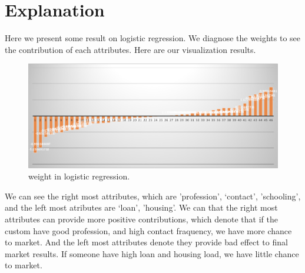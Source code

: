 \section{Explanation}

Here we present some result on logistic regression. We diagnose the weights to see the contribution of each attributes. Here are our visualization results.

\begin{figure}[ht]
    \centering
    \includegraphics[width=1\linewidth]{img/ttt.pdf}
    \caption{weight in logistic regression.}
\end{figure}

We can see the right most attributes, which are 'profession', `contact', 'schooling',  and the left most atributes are `loan', 'housing'. We can that the right most attributes can provide more positive contributions, which denote that if the custom have good profession, and high contact fraquency, we have more chance to market. And the left most attributes denote they provide bad effect to final market results. If someone have high loan and housing load, we have little chance to market.


